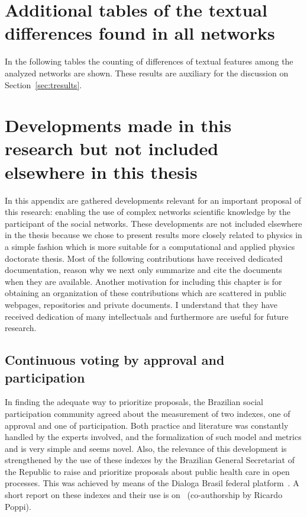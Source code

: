 
\begin{apendicesenv}
	\partapendices
	\chapter{Additional tables of the textual differences found in all networks}\label{ap:textd}
In the following tables the counting of differences of textual features among the analyzed networks
are shown.
	These results are auxiliary for the discussion on Section~\ref{sec:tresults}.
\FloatBarrier











\chapter{Developments made in this research but not included elsewhere in this thesis}\label{ap:vot}
In this appendix are gathered developments relevant for an important proposal of this research:
enabling the use of complex networks scientific knowledge by the participant of the social networks.
These developments are not included elsewhere in the thesis because we chose to present results
more closely related to physics in a simple fashion which is more suitable for a computational and applied physics doctorate thesis.
Most of the following contributions have received dedicated documentation,
reason why we next only summarize and cite the documents when they are available.
Another motivation for including this chapter is for obtaining an organization of these contributions
which are scattered in public webpages, repositories and private documents.
I understand that they have received dedication of many intellectuals
and furthermore are useful for future research.

\section{Continuous voting by approval and participation}
In finding the adequate way to prioritize proposals, the Brazilian social participation community agreed about the measurement of two indexes,
one of approval and one of participation. Both practice and literature
was constantly handled by the experts involved, and the formalization
of such model and metrics and is very simple and seems novel.
Also, the relevance of this development is strengthened by the use of these indexes by the
Brazilian General Secretariat of the Republic to raise and prioritize
proposals about public health care in open processes.
This was achieved by means of the Dialoga Brasil federal platform~\cite{dialoga}.
A short report on these indexes and their use is on~\cite{dialogaAlg}
	(co-authorship by Ricardo Poppi).


\end{apendicesenv}
